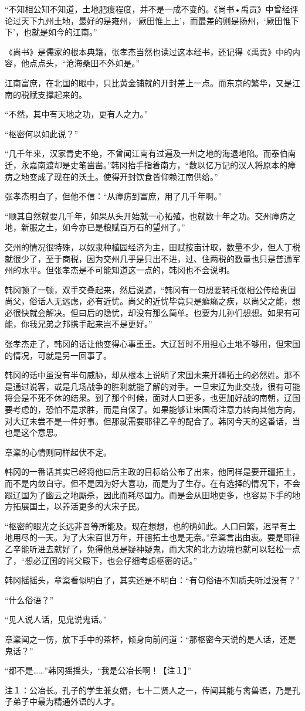“不知相公知不知道，土地肥瘦程度，并不是一成不变的。《尚书•禹贡》中曾经评论过天下九州土地，最好的是雍州，‘厥田惟上上’，而最差的则是扬州，‘厥田惟下下’，也就是如今的江南。”

《尚书》是儒家的根本典籍，张孝杰当然也读过这本经书，还记得《禹贡》中的内容，他点点头，“沧海桑田不外如是。”

江南富庶，在北国的眼中，只比黄金铺就的开封差上一点。而东京的繁华，又是江南的税赋支撑起来的。

“不然，其中有天地之功，更有人之力。”

“枢密何以如此说？”

“几千年来，汉家青史不绝，不曾闻江南有过遍及一州之地的海退地陷。而泰伯南迁，永嘉南渡却是史笔凿凿。”韩冈抬手指着南方，“数以亿万记的汉人将原本的瘴疠之地变成了现在的沃土。使得开封饮食皆仰赖江南供给。”

张孝杰明白了，但他不信：“从瘴疠到富庶，用了几千年啊。”

“顺其自然就要几千年，如果从头开始就一心拓殖，也就数十年之功。交州瘴疠之地，新服之土，如今亦已是粮赋百万石的望州了。”

交州的情况很特殊，以奴隶种植园经济为主，田赋按亩计取，数量不少，但人丁税就很少了，至于商税，因为交州几乎是只出不进，过、住两税的数量也只是普通军州的水平。但张孝杰是不可能知道这一点的，韩冈也不会说明。

韩冈顿了一顿，双手交叠起来，然后说道，“韩冈有一句想要转托张相公传给贵国尚父，俗话人无远虑，必有近忧。尚父的近忧毕竟只是癣癞之疾，以尚父之能，想必很快就会解决。但曰后的隐忧，却没有那么简单。也要为儿孙们想想。如果有可能，你我兄弟之邦携手起来岂不是更好。”

张孝杰走了，韩冈的话让他变得心事重重。大辽暂时不用担心土地不够用，但宋国的情况，可就是另一回事了。

韩冈的话中虽没有半句威胁，却从根本上说明了宋国未来开疆拓土的必然姓。那不是通过说客，或是几场战争的胜利就能了解的对手。一旦宋辽为此交战，很有可能将会是不死不休的结果。到了那个时候，面对人口更多，也更加好战的南朝，辽国要考虑的，恐怕不是求胜，而是自保了。如果能够让宋国将注意力转向其他方向，对大辽未尝不是一件好事。但那就需要耶律乙辛的配合了。韩冈今天的这番话，当也是这个意思。

章楶的心情则同样起伏不定。

韩冈的一番话其实已经将他曰后主政的目标给公布了出来，他同样是要开疆拓土，而不是内敛自守。但不是因为好大喜功，而是为了生存。在有选择的情况下，不会跟辽国为了幽云之地厮杀，因此而耗尽国力。而是会从田地更多，也容易下手的地方拓展国土，以养活更多的大宋子民。

“枢密的眼光之长远非吾等所能及。现在想想，也的确如此。人口曰繁，迟早有土地用尽的一天。为了大宋百世万年，开疆拓土也是无奈。”章楶言出由衷。要是耶律乙辛能听进去就好了，免得他总是疑神疑鬼，而大宋的北方边境也就可以轻松一点了，“想必辽国的尚父殿下，也会仔细考虑枢密的话。”

韩冈摇摇头，章楶看似明白了，其实还是不明白：“有句俗语不知质夫听过没有？”

“什么俗语？”

“见人说人话，见鬼说鬼话。”

章楶闻之一愣，放下手中的茶杯，倾身向前问道：“那枢密今天说的是人话，还是鬼话？”

“都不是……”韩冈摇摇头，“我是公冶长啊！【注１】”

注１：公冶长。孔子的学生兼女婿，七十二贤人之一，传闻其能与禽兽语，乃是孔子弟子中最为精通外语的人才。

